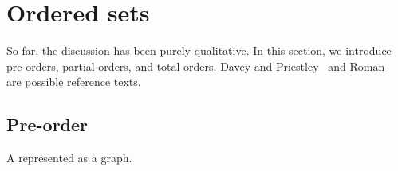 
\section{Ordered sets}

\label{sec:tradeoffs-ordered-sets}


%


So far, the discussion has been purely qualitative.
In this section, we introduce pre-orders, partial orders, and total orders.
Davey and Priestley~\cite{davey02} and Roman~\cite{roman08} are possible reference texts.


\vspace{2cm}

\subsection{Pre-order}



\begin{marginfigure}
    \centering
    \caption{A  represented as a graph.}
    \label{fig:pre_order_graph}
\end{marginfigure}

